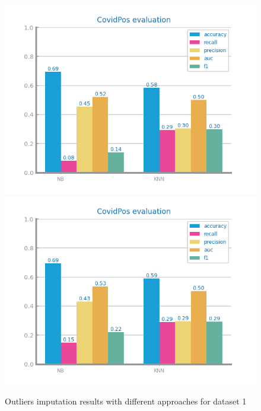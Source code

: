 \documentclass[10pt]{extarticle}
\begin{document}
\begin{figure}[H]
\includegraphics[scale=0.80]{images/dataset1/data_preparation/CovidPos_outliers_treat_rowDrop_StdBased.png}
\includegraphics[scale=0.80]{images/dataset1/data_preparation/CovidPos_outliers_treat_truncating_minmax.png}
\caption{Outliers imputation results with different approaches for dataset 1}
\end{figure}
\end{document}
